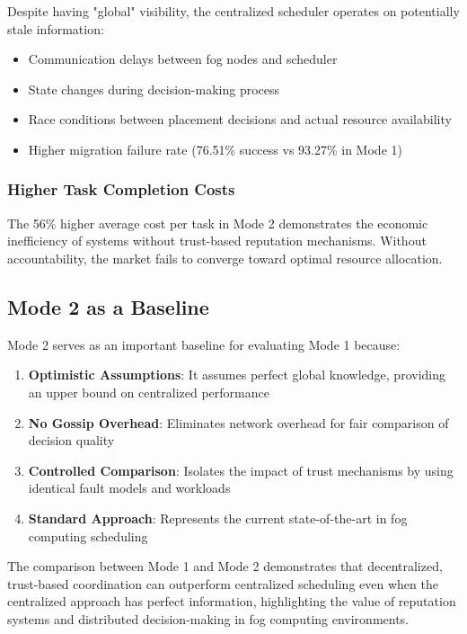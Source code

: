 \documentclass[12pt,a4paper]{article}
\begin{document}
Despite having "global" visibility, the centralized scheduler operates on potentially stale information:
\begin{itemize}
    \item Communication delays between fog nodes and scheduler
    \item State changes during decision-making process
    \item Race conditions between placement decisions and actual resource availability
    \item Higher migration failure rate (76.51\% success vs 93.27\% in Mode 1)
\end{itemize}

\subsubsection{Higher Task Completion Costs}

The 56\% higher average cost per task in Mode 2 demonstrates the economic inefficiency of systems without trust-based reputation mechanisms. Without accountability, the market fails to converge toward optimal resource allocation.

\subsection{Mode 2 as a Baseline}

Mode 2 serves as an important baseline for evaluating Mode 1 because:
\begin{enumerate}
    \item \textbf{Optimistic Assumptions}: It assumes perfect global knowledge, providing an upper bound on centralized performance
    \item \textbf{No Gossip Overhead}: Eliminates network overhead for fair comparison of decision quality
    \item \textbf{Controlled Comparison}: Isolates the impact of trust mechanisms by using identical fault models and workloads
    \item \textbf{Standard Approach}: Represents the current state-of-the-art in fog computing scheduling
\end{enumerate}

The comparison between Mode 1 and Mode 2 demonstrates that decentralized, trust-based coordination can outperform centralized scheduling even when the centralized approach has perfect information, highlighting the value of reputation systems and distributed decision-making in fog computing environments.
\end{document}
